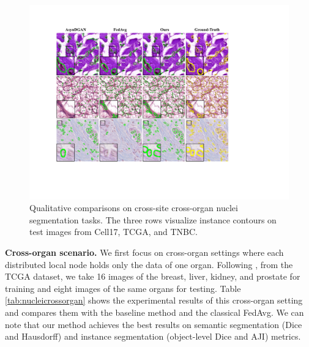 \documentclass[letterpaper]{article} %
\begin{document}
\begin{figure}[h]
\centering
\includegraphics[width=1.0\linewidth]{fig/fig3.pdf}
\caption{Qualitative comparisons on cross-site cross-organ nuclei segmentation tasks. The three rows visualize instance contours on test images from Cell17, TCGA, and TNBC.} 
\label{fig3}
\end{figure}

\textbf{Cross-organ scenario.}
We first focus on cross-organ settings where each distributed local node holds only the data of one organ. Following \cite{chang2020synthetic}, from the TCGA dataset, we take 16 images of the breast, liver, kidney, and prostate for training and eight images of the same organs for testing. 
Table \ref{tab:nucleicrossorgan} shows the experimental results of this cross-organ setting and compares them with the baseline method \cite{chang2020synthetic} and the classical FedAvg. We can note that our method achieves the best results on semantic segmentation (Dice and Hausdorff) and instance segmentation (object-level Dice and AJI) metrics. %
\end{document}
